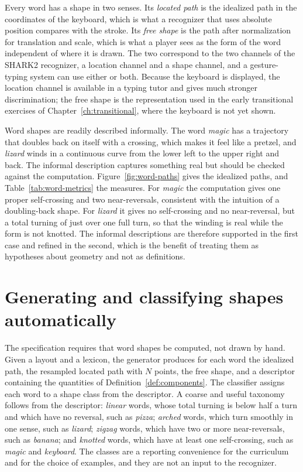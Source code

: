 Every word has a shape in two senses. Its \emph{located path} is the idealized path in the coordinates of the keyboard, which is what a recognizer that uses absolute position compares with the stroke. Its \emph{free shape} is the path after normalization for translation and scale, which is what a player sees as the form of the word independent of where it is drawn. The two correspond to the two channels of the SHARK2 recognizer, a location channel and a shape channel,\evD{} and a gesture-typing system can use either or both. Because the keyboard is displayed, the location channel is available in a typing tutor and gives much stronger discrimination; the free shape is the representation used in the early transitional exercises of Chapter~\ref{ch:transitional}, where the keyboard is not yet shown.

Word shapes are readily described informally. The word \textit{magic} has a trajectory that doubles back on itself with a crossing, which makes it feel like a pretzel, and \textit{lizard} winds in a continuous curve from the lower left to the upper right and back. The informal description captures something real but should be checked against the computation. Figure~\ref{fig:word-paths} gives the idealized paths, and Table~\ref{tab:word-metrics} the measures. For \textit{magic} the computation gives one proper self-crossing and two near-reversals, consistent with the intuition of a doubling-back shape. For \textit{lizard} it gives no self-crossing and no near-reversal, but a total turning of just over one full turn, so that the winding is real while the form is not knotted. The informal descriptions are therefore supported in the first case and refined in the second, which is the benefit of treating them as hypotheses about geometry and not as definitions.



\section{Generating and classifying shapes automatically}

The specification requires that word shapes be computed, not drawn by hand. Given a layout and a lexicon, the generator produces for each word the idealized path, the resampled located path with $N$ points, the free shape, and a descriptor containing the quantities of Definition~\ref{def:components}. The classifier assigns each word to a shape class from the descriptor. A coarse and useful taxonomy follows from the descriptor: \emph{linear} words, whose total turning is below half a turn and which have no reversal, such as \textit{pizza}; \emph{arched} words, which turn smoothly in one sense, such as \textit{lizard}; \emph{zigzag} words, which have two or more near-reversals, such as \textit{banana}; and \emph{knotted} words, which have at least one self-crossing, such as \textit{magic} and \textit{keyboard}. The classes are a reporting convenience for the curriculum and for the choice of examples, and they are not an input to the recognizer.


